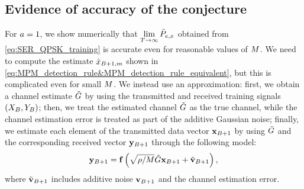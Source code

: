 \documentclass[12pt, draftclsnofoot,journal,onecolumn]{IEEEtran}
\begin{document}
\subsection{Evidence of accuracy of the conjecture}
\label{sec:finite_OK}

For $a=1$, we show numerically that $\lim\limits_{T\to\infty} \bar{P}_{e,x}$ obtained from \eqref{eq:SER_QPSK_training} is accurate even for reasonable values of $M$.  We need to compute the estimate $\hat{x}_{B+1,m}$ shown in \eqref{eq:MPM_detection_rule&MPM_detection_rule_equivalent}, but this is complicated  even for small $M$.  We instead use an approximation: first, we obtain a channel estimate $\tilde{G}$ by using the  transmitted and received training signals $(X_{B},Y_{B})$; then, we treat the estimated channel $\tilde{G}$ as the true channel, while the channel estimation error is treated as part of the additive Gaussian noise; finally, we estimate each element of the transmitted data vector ${\mathbf{x}}_{B+1}$ by using $\tilde{G}$ and the corresponding received vector ${\mathbf{y}}_{B+1}$ through the following model:
\begin{align}
    {\mathbf{y}}_{B+1} = {\mathbf{f}}\left(\sqrt{{\rho}/{M}}\tilde{G}{\mathbf{x}}_{B+1}+\tilde{{\mathbf{v}}}_{B+1}\right),
    \label{eq:equivalent_MMSE_detection_model}
\end{align}
where $\tilde{{\mathbf{v}}}_{B+1}$ includes additive noise ${\mathbf{v}}_{B+1}$ and the channel estimation error. 
\end{document}
